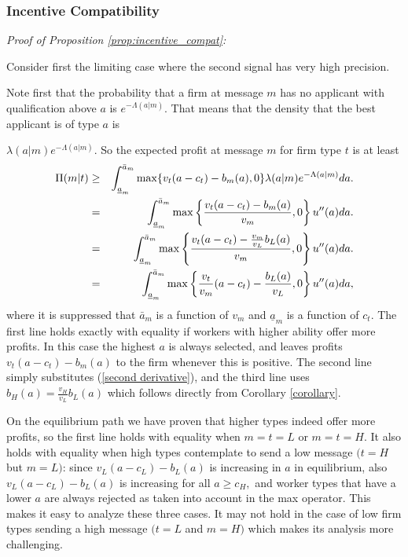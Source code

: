 \documentclass[12pt]{article}
\begin{document}
\subsubsection{Incentive Compatibility}
\label{online_app:incentive-compatibility}

\noindent \textit{Proof of Proposition \ref{prop:incentive_compat}:} 

Consider first the limiting case where the second signal has very high precision. 

Note first that the probability
that a firm at message $m$ has no applicant with qualification above $a$ is $%
e^{-\Lambda (a|m)}.$ That means that the density that the best applicant is
of type $a$ is

$\lambda (a|m)e^{-\Lambda (a|m)}$. So the expected profit at message $m$ for
firm type $t$ is at least%
\begin{eqnarray}
\Pi (m|t) &\geq &\int_{\underline{a}_{m}}^{\bar{a}_{m}}\max
\{v_{t}(a-c_{t})-b_{m}(a),0\}\lambda (a|m)e^{-\Lambda (a|m)}da.  \notag \\
&=&\int_{\underline{a}_{m}}^{\bar{a}_{m}}\max \left\{ \frac{%
v_{t}(a-c_{t})-b_{m}(a)}{v_{m}},0\right\} u^{\prime \prime }(a)da.
\label{truth-start} \\
&=&\int_{\underline{a}_{m}}^{\bar{a}_{m}}\max \left\{ \frac{v_{t}(a-c_{t})-%
\frac{v_{m}}{v_{L}}b_{L}(a)}{v_{m}},0\right\} u^{\prime \prime }(a)da. 
\notag \\
&=&\int_{\underline{a}_{m}}^{\bar{a}_{m}}\max \left\{ \frac{v_{t}}{v_{m}}%
(a-c_{t})-\frac{b_{L}(a)}{v_{L}},0\right\} u^{\prime \prime }(a)da,  \notag
\end{eqnarray}%
where it is suppressed that $\bar{a}_{m}$ is a function of $v_{m}$ and $%
\underline{a}_{m}$ is a function of $c_{t}.$ The first line holds exactly
with equality if workers with higher ability offer more profits. In this
case the highest $a$ is always selected, and leaves profits $%
v_{t}(a-c_{t})-b_{m}(a)$ to the firm whenever this is positive. The second
line simply substitutes (\ref{second derivative}), and the third line uses $%
b_{H}(a)=\frac{v_{H}}{v_{L}}b_{L}(a)$ which follows directly from Corollary %
\ref{corollary}.

On the equilibrium path we have proven that higher types indeed offer more
profits, so the first line holds with equality when $m=t=L$ or $m=t=H.$ It
also holds with equality when high types contemplate to send a low message $%
(t=H$ but $m=L)$: since $v_{L}(a-c_{L})-b_{L}(a)$ is increasing in $a$ in
equilibrium, also $v_{L}(a-c_{L})-b_{L}(a)$ is increasing for all $a\geq
c_{H},$ and worker types that have a lower $a$ are always rejected as taken
into account in the max operator. This makes it easy to analyze these three
cases. It may not hold in the case of low firm types sending a high message $%
(t=L$ and $m=H)$ which makes its analysis more challenging.
\end{document}
